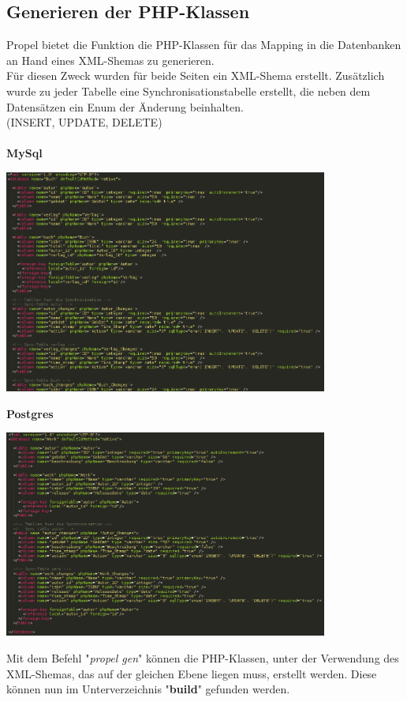 \documentclass[a4paper]{article}
\begin{document}
	\subsection{Generieren der PHP-Klassen}
	Propel bietet die Funktion die PHP-Klassen für das Mapping in die Datenbanken an Hand eines XML-Shemas zu generieren.\\
	Für diesen Zweck wurden für beide Seiten ein XML-Shema erstellt. Zusätzlich wurde zu jeder Tabelle eine Synchronisationstabelle erstellt, die neben dem Datensätzen ein Enum der Änderung beinhalten.\\
	(INSERT, UPDATE, DELETE)\\
	\\
	\textbf{MySql}
	\begin{center}
		\includegraphics[width=0.8\textwidth]{img/mySql-Shema.png}
		\\
	\end{center}
	
	\textbf{Postgres}
	\begin{center}
		\includegraphics[width=0.8\textwidth]{img/postgres-Shema.png}
		\\
	\end{center}
	Mit dem Befehl "\textit{propel gen}" können die PHP-Klassen, unter der Verwendung des XML-Shemas, das auf der gleichen Ebene liegen muss, erstellt werden. Diese können nun im Unterverzeichnis "\textbf{build}" gefunden werden.
	
\end{document}
